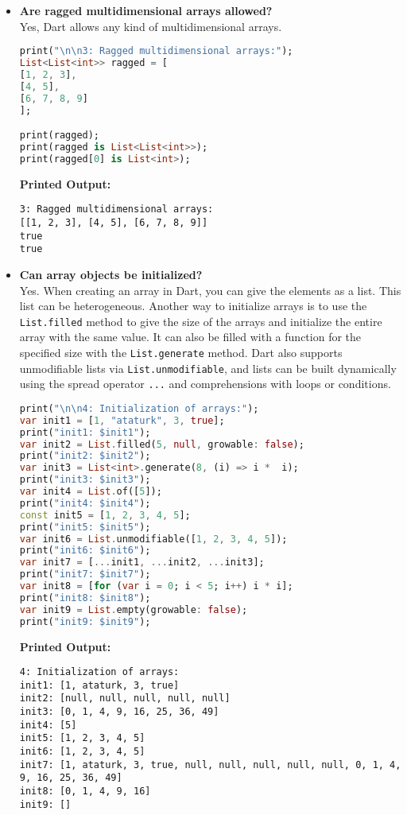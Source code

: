 \documentclass{article}
\begin{document}
\begin{itemize}
\item \textbf{Are ragged multidimensional arrays allowed?} \\
Yes, Dart allows any kind of multidimensional arrays.
\begin{lstlisting}[language=Dart]
print("\n\n3: Ragged multidimensional arrays:");
List<List<int>> ragged = [
[1, 2, 3],
[4, 5],
[6, 7, 8, 9]
];

print(ragged);
print(ragged is List<List<int>>);
print(ragged[0] is List<int>);
\end{lstlisting}
\textbf{Printed Output:}
\begin{verbatim}
3: Ragged multidimensional arrays:
[[1, 2, 3], [4, 5], [6, 7, 8, 9]]
true
true
\end{verbatim}


\item \textbf{Can array objects be initialized?} \\
Yes. When creating an array in Dart, you can give the elements as a list. This list can be heterogeneous. Another way to initialize arrays is to use the \texttt{List.filled} method to give the size of the arrays and initialize the entire array with the same value. It can also be filled with a function for the specified size with the \texttt{List.generate} method. Dart also supports unmodifiable lists via \texttt{List.unmodifiable}, and lists can be built dynamically using the spread operator \texttt{...} and comprehensions with loops or conditions.

\begin{lstlisting}[language=Dart]
print("\n\n4: Initialization of arrays:");
var init1 = [1, "ataturk", 3, true];
print("init1: $init1");
var init2 = List.filled(5, null, growable: false);
print("init2: $init2"); 
var init3 = List<int>.generate(8, (i) => i *  i); 
print("init3: $init3");
var init4 = List.of([5]);
print("init4: $init4");
const init5 = [1, 2, 3, 4, 5];
print("init5: $init5");
var init6 = List.unmodifiable([1, 2, 3, 4, 5]);
print("init6: $init6");
var init7 = [...init1, ...init2, ...init3];
print("init7: $init7");
var init8 = [for (var i = 0; i < 5; i++) i * i];
print("init8: $init8");
var init9 = List.empty(growable: false);
print("init9: $init9");
\end{lstlisting}
\textbf{Printed Output:}
\begin{verbatim}
4: Initialization of arrays:
init1: [1, ataturk, 3, true]
init2: [null, null, null, null, null]
init3: [0, 1, 4, 9, 16, 25, 36, 49]
init4: [5]
init5: [1, 2, 3, 4, 5]
init6: [1, 2, 3, 4, 5]
init7: [1, ataturk, 3, true, null, null, null, null, null, 0, 1, 4, 9, 16, 25, 36, 49]
init8: [0, 1, 4, 9, 16]
init9: []
\end{verbatim}



\end{itemize}
\end{document}
